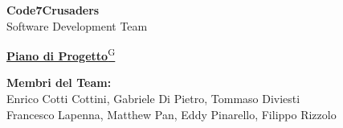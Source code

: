 \documentclass{article}
\begin{document}
\begin{titlepage}
    {\Huge \textbf{Code7Crusaders}}\\
    \vspace{0.5cm}
    {\Large Software Development Team}\\
    \vspace{2cm}

    {\large \href{https://code7crusaders.github.io/docs/PB/documentazione_interna/glossario.html#piano-di-progetto}{\textbf{Piano di Progetto}\textsuperscript{G}}}\\
    \vspace{5cm}


    \textbf{Membri del Team:}\\
    Enrico Cotti Cottini, Gabriele Di Pietro, Tommaso Diviesti \\
    Francesco Lapenna, Matthew Pan, Eddy Pinarello, Filippo Rizzolo \\
    \vspace{0.5cm}

    \vspace{1cm}
\end{titlepage}
\end{document}
